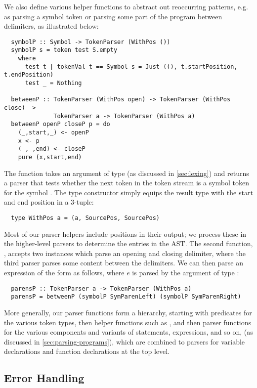 We also define various helper functions to abstract out reoccurring patterns,
e.g. as parsing a symbol token or parsing some part of the program between
delimiters, as illustrated below:
\begin{verbatim}
  symbolP :: Symbol -> TokenParser (WithPos ())
  symbolP s = token test S.empty
    where
      test t | tokenVal t == Symbol s = Just ((), t.startPosition, t.endPosition)
      test _ = Nothing

  betweenP :: TokenParser (WithPos open) -> TokenParser (WithPos close) ->
              TokenParser a -> TokenParser (WithPos a)
  betweenP openP closeP p = do
    (_,start,_) <- openP
    x <- p
    (_,_,end) <- closeP
    pure (x,start,end)
\end{verbatim}
%
The function  takes an argument  of type
 (as discussed in \cref{sec:lexing}) and returns a parser that
tests whether the next token in the token stream is a symbol token for the
symbol .
The  type constructor simply equips the result type with the
start and end position in a 3-tuple:
\begin{verbatim}
  type WithPos a = (a, SourcePos, SourcePos)
\end{verbatim}
Most of our parser helpers include positions in their output; we process these
in the higher-level parsers to determine the  entries in the AST.
The second function, , accepts two 
instances which parse an opening and closing delimiter, where the third parser
 parses some content between the delimiters.
We can then parse an expression of the form  as follows, where $e$
is parsed by the argument of type :
\begin{verbatim}
  parensP :: TokenParser a -> TokenParser (WithPos a)
  parensP = betweenP (symbolP SymParenLeft) (symbolP SymParenRight)
\end{verbatim}

More generally, our parser functions form a hierarchy, starting with predicates
for the various token types, then helper functions such as ,
and then parser functions for the various components and variants of statements,
expressions, and so on, (as discussed in \cref{sec:parsing-programs}), which are
combined to parsers for variable declarations and function declarations at the
top level.


\subsection{Error Handling} \label{sec:parser-error-handling}

